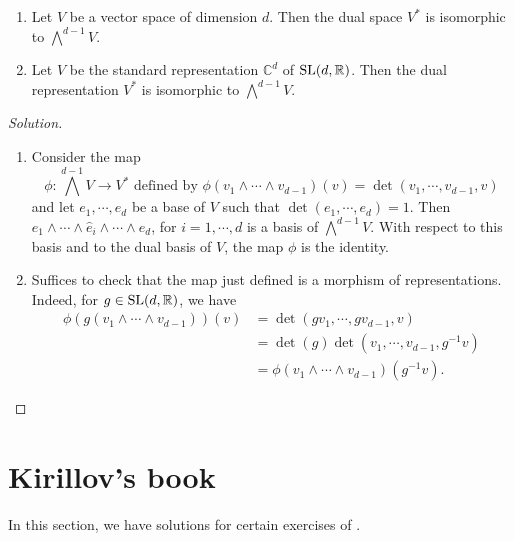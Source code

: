 \documentclass{report}
\begin{document}
\begin{exercise}\label{ex:dual_space_as_wedge_product}
    \begin{enumerate}[label = (\alph*)]
        \item Let $V$ be a vector space of dimension $d$.
        Then the dual space $V^*$ is isomorphic to $\bigwedge^{d-1} V$.
        \item Let $V$ be the standard representation $\mathbb C^d$ of $\operatorname{{\mathrm{SL}}}(d, \mathbb R)$. Then the dual representation $V^*$ is isomorphic to $\bigwedge^{d-1} V$.
    \end{enumerate}
    
\end{exercise}
\begin{proof}[Solution]
    \begin{enumerate}[label = (\alph*)]
        \item 
    Consider the map 
    \[
    \phi: \bigwedge^{d-1} V \to V^* \text{ defined by } \phi(v_1 \wedge \cdots \wedge v_{d-1})(v) = \det(v_1, \cdots, v_{d-1}, v)
    \] 
    and let $e_1, \cdots, e_d$ be a base of $V$ such that $\det(e_1, \cdots, e_d) = 1$.
    Then $e_1 \wedge \cdots \wedge \hat e_i \wedge \cdots \wedge e_d$, for $i = 1, \cdots, d$ is a basis of $\bigwedge^{d-1} V$.
    With respect to this basis and to the dual basis of $V$, the map $\phi$ is the identity.
        \item
    Suffices to check that the map just defined is a morphism of representations.
    Indeed, for $g \in \operatorname{{\mathrm{SL}}}(d, \mathbb R)$, we have
    \begin{align*}
        \phi(g(v_1 \wedge \cdots \wedge v_{d-1}))(v) &= \det(gv_1, \cdots, gv_{d-1}, v)\\
        &= \det(g) \det(v_1, \cdots, v_{d-1}, g^{-1}v)\\
        &= \phi(v_1 \wedge \cdots \wedge v_{d-1})(g^{-1}v).
    \end{align*}
    \end{enumerate}
\end{proof}

\section{Kirillov's book}
In this section, we have solutions for certain exercises of \cite{kirillov2008introduction}.
\end{document}
